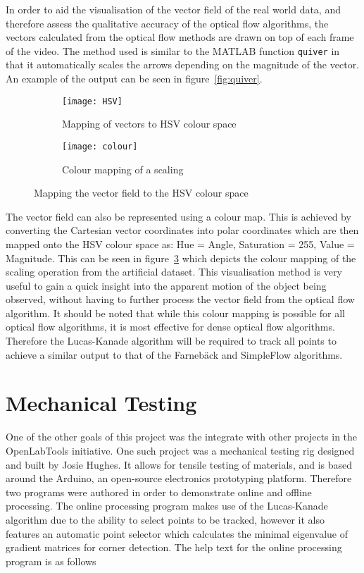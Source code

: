 In order to aid the visualisation of the vector field of the real world data, and therefore assess the qualitative accuracy of the optical flow algorithms, the vectors calculated from the optical flow methods are drawn on top of each frame of the video. The method used is similar to the MATLAB function \verb|quiver| in that it automatically scales the arrows depending on the magnitude of the vector. An example of the output can be seen in figure~\ref{fig:quiver}.

\begin{figure}[htbp!]
  \centering
  \begin{subfigure}[b]{0.45\textwidth}
    \texttt{[image: HSV]}
    \caption{Mapping of vectors to HSV colour space}
    \label{fig:hsv}
  \end{subfigure}
  \begin{subfigure}[b]{0.45\textwidth}
    \texttt{[image: colour]}
    \caption{Colour mapping of a scaling}
    \label{fig:colourmap}
  \end{subfigure}
  \caption{Mapping the vector field to the HSV colour space}
  \label{fig:colour}
\end{figure}

The vector field can also be represented using a colour map. This is achieved by converting the Cartesian vector coordinates into polar coordinates which are then mapped onto the HSV colour space as: Hue = Angle, Saturation = 255, Value = Magnitude. This can be seen in figure~\ref{fig:colour} which depicts the colour mapping of the scaling operation from the artificial dataset. This visualisation method is very useful to gain a quick insight into the apparent motion of the object being observed, without having to further process the vector field from the optical flow algorithm. It should be noted that while this colour mapping is possible for all optical flow algorithms, it is most effective for dense optical flow algorithms. Therefore the Lucas-Kanade algorithm will be required to track all points to achieve a similar output to that of the Farnebäck and SimpleFlow algorithms.

\section{Mechanical Testing}

One of the other goals of this project was the integrate with other projects in the OpenLabTools initiative. One such project was a mechanical testing rig designed and built by Josie Hughes. It allows for tensile testing of materials, and is based around the Arduino, an open-source electronics prototyping platform. Therefore two programs were authored in order to demonstrate online and offline processing. The online processing program makes use of the Lucas-Kanade algorithm due to the ability to select points to be tracked, however it also features an automatic point selector which calculates the minimal eigenvalue of gradient matrices for corner detection. The help text for the online processing program is as follows

